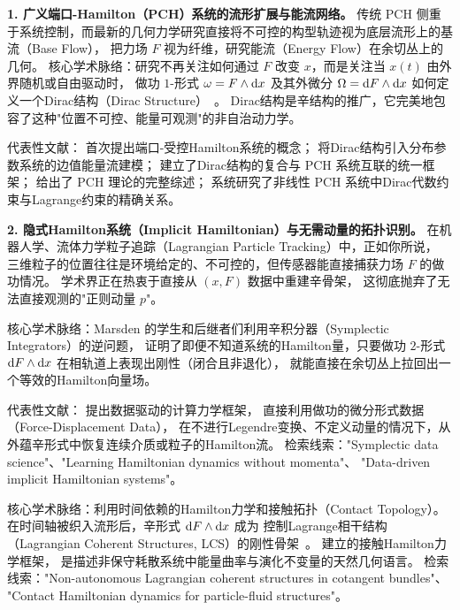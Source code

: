 ﻿\documentclass[10pt,a4paper]{article}
\numberwithin{equation}{section}
\begin{document}
\begin{framed}


\textbf{1. 广义端口-Hamilton（PCH）系统的流形扩展与能流网络。}
传统 PCH 侧重于系统控制，而最新的几何力学研究直接将不可控的构型轨迹视为底层流形上的基流（Base Flow），
把力场 $F$ 视为纤维，研究能流（Energy Flow）在余切丛上的几何。
核心学术脉络：研究不再关注如何通过 $F$ 改变 $x$，而是关注当 $x(t)$ 由外界随机或自由驱动时，
做功 $1$-形式 $\omega = F \wedge \text dx$ 及其外微分 $\Omega = \text dF \wedge \text dx$ 如何定义一个Dirac结构（Dirac Structure）~\cite{Courant1990}。
Dirac结构是辛结构的推广，它完美地包容了这种"位置不可控、能量可观测"的非自治动力学。

代表性文献：\textcite{MaschkeVanDerSchaft1992} 首次提出端口-受控Hamilton系统的概念；
\textcite{VanDerSchaftMaschke2002} 将Dirac结构引入分布参数系统的边值能量流建模；
\textcite{CerveraVanDerSchaftBanos2007} 建立了Dirac结构的复合与 PCH 系统互联的统一框架；
\textcite{VanDerSchaftJeltsema2014} 给出了 PCH 理论的完整综述；
\textcite{VanDerSchaftMaschke2020} 系统研究了非线性 PCH 系统中Dirac代数约束与Lagrange约束的精确关系。

\textbf{2. 隐式Hamilton系统（Implicit Hamiltonian）与无需动量的拓扑识别。}
在机器人学、流体力学粒子追踪（Lagrangian Particle Tracking）中，正如你所说，
三维粒子的位置往往是环境给定的、不可控的，但传感器能直接捕获力场 $F$ 的做功情况。
学术界正在热衷于直接从 $(x, F)$ 数据中重建辛骨架，
这彻底抛弃了无法直接观测的"正则动量 $p$"。

核心学术脉络：Marsden 的学生和后继者们利用辛积分器（Symplectic Integrators）的逆问题，
证明了即便不知道系统的Hamilton量，只要做功 $2$-形式 $\text dF \wedge \text dx$ 在相轨道上表现出刚性（闭合且非退化），
就能直接在余切丛上拉回出一个等效的Hamilton向量场。

代表性文献：\textcite{KirchdoerferOrtiz2016} 提出数据驱动的计算力学框架，
直接利用做功的微分形式数据（Force-Displacement Data），
在不进行Legendre变换、不定义动量的情况下，从外蕴辛形式中恢复连续介质或粒子的Hamilton流。
检索线索："Symplectic data science"、"Learning Hamiltonian dynamics without momenta"、
"Data-driven implicit Hamiltonian systems"。


核心学术脉络：利用时间依赖的Hamilton力学和接触拓扑（Contact Topology）。
在时间轴被织入流形后，辛形式 $\text dF \wedge \text dx$ 成为
控制Lagrange相干结构（Lagrangian Coherent Structures, LCS）的刚性骨架~\cite{Haller2015}。
\textcite{BravettiCruzTapias2017} 建立的接触Hamilton力学框架，
是描述非保守耗散系统中能量曲率与演化不变量的天然几何语言。
检索线索："Non-autonomous Lagrangian coherent structures in cotangent bundles"、
"Contact Hamiltonian dynamics for particle-fluid structures"。


\end{framed}
\end{document}
